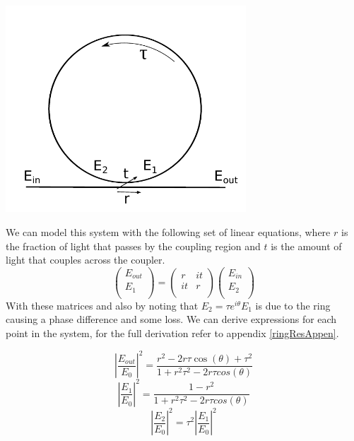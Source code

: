 \begingroup
\centering
    \includegraphics[width=9cm]{img/theory/ring.pdf} \label{ringModel}
\endgroup

We can model this system with the following set of linear equations, where $r$ is the fraction of light that passes by the coupling region and $t$ is the amount of light that couples across the coupler.
\begin{equation}
\begin{pmatrix}
E_{out} \\
E_{1} \\
\end{pmatrix}
=
\begin{pmatrix}
r & it \\
it & r \\
\end{pmatrix}
\begin{pmatrix}
E_{in} \\
E_{2} \\
\end{pmatrix}
\end{equation}
\noindent
With these matrices and also by noting that $E_2=\tau e^{i\theta}E_1$ is due to the ring causing a phase difference and some loss. We can derive expressions for each point in the system, for the full derivation refer to appendix \ref{ringResAppen}.

\begin{equation}
\left |\frac{E_{out}}{E_{0}}\right|^2=\frac{r^2-2r\tau\cos(\theta)+\tau^2}{1+r^2\tau^2-2r\tau cos(\theta)}
\end{equation}
\begin{equation}
\left|\frac{E_{1}}{E_{0}}\right |^2=\frac{1-r^2}{1+r^2\tau^2-2r\tau cos(\theta)}
\end{equation}
\begin{equation}
\left |\frac{E_{2}}{E_{0}}\right |^2=\tau^2\left|\frac{E_{1}}{E_{0}}\right |^2
\end{equation}

